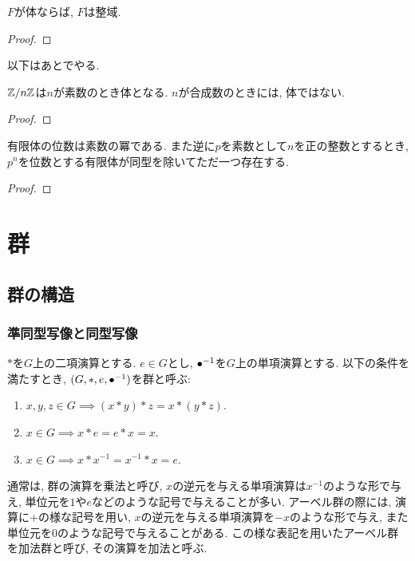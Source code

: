 \begin{prop}
  $F$が体ならば, $F$は整域.
\end{prop}
\begin{proof}\end{proof}


以下はあとでやる.
\begin{prop}
  $\mathbb{Z}/n\mathbb{Z}$は$n$が素数のとき体となる.
  $n$が合成数のときには, 体ではない.
\end{prop}
\begin{proof}\end{proof}

\begin{prop}
  有限体の位数は素数の冪である.
  また逆に$p$を素数として$n$を正の整数とするとき,
  $p^n$を位数とする有限体が同型を除いてただ一つ存在する.
\end{prop}
\begin{proof}\end{proof}

\chapter{群}
\section{群の構造}
\subsection{準同型写像と同型写像}
\begin{definition}[再掲]
  $\ast$を$G$上の二項演算とする.
  $e\in G$とし,
  ${\bullet}^{-1}$を$G$上の単項演算とする.
  以下の条件を満たすとき,
  $(G,\ast,e,{\bullet}^{-1})$を群と呼ぶ:
  \begin{enumerate}
  \item $x,y,z\in G\implies (x\ast y) \ast z = x\ast (y\ast z)$.
  \item $x\in G\implies x\ast e=e\ast x =x$.
  \item $x\in G \implies x\ast x^{-1}=x^{-1}\ast x =e$.
  \end{enumerate}
\end{definition}
\begin{remark}
  通常は,
  群の演算を乗法と呼び,
  $x$の逆元を与える単項演算は$x^{-1}$のような形で与え,
  単位元を$1$や$e$などのような記号で与えることが多い.
  アーベル群の際には,
  演算に$+$の様な記号を用い,
  $x$の逆元を与える単項演算を$-x$のような形で与え,
  また単位元を$0$のような記号で与えることがある.
  この様な表記を用いたアーベル群を加法群と呼び,
  その演算を加法と呼ぶ.
\end{remark}

